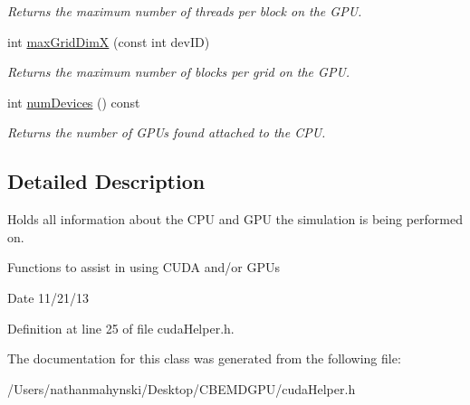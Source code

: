 \begin{DoxyCompactItemize}
\begin{DoxyCompactList}\small\item\em Returns the maximum number of threads per block on the G\-P\-U. \end{DoxyCompactList}\item 
\hypertarget{classsystem_props_a3327d282f881885ebcb8949d8ec6e3ec}{int \hyperlink{classsystem_props_a3327d282f881885ebcb8949d8ec6e3ec}{max\-Grid\-Dim\-X} (const int dev\-I\-D)}\label{classsystem_props_a3327d282f881885ebcb8949d8ec6e3ec}

\begin{DoxyCompactList}\small\item\em Returns the maximum number of blocks per grid on the G\-P\-U. \end{DoxyCompactList}\item 
\hypertarget{classsystem_props_a1cb3107e255e38046372edc757ddc6b2}{int \hyperlink{classsystem_props_a1cb3107e255e38046372edc757ddc6b2}{num\-Devices} () const }\label{classsystem_props_a1cb3107e255e38046372edc757ddc6b2}

\begin{DoxyCompactList}\small\item\em Returns the number of G\-P\-Us found attached to the C\-P\-U. \end{DoxyCompactList}\end{DoxyCompactItemize}


\subsection{Detailed Description}
Holds all information about the C\-P\-U and G\-P\-U the simulation is being performed on. 

Functions to assist in using C\-U\-D\-A and/or G\-P\-Us \begin{DoxyDate}{Date}
11/21/13 
\end{DoxyDate}


Definition at line 25 of file cuda\-Helper.\-h.



The documentation for this class was generated from the following file\-:\begin{DoxyCompactItemize}
\item 
/\-Users/nathanmahynski/\-Desktop/\-C\-B\-E\-M\-D\-G\-P\-U/cuda\-Helper.\-h\end{DoxyCompactItemize}
